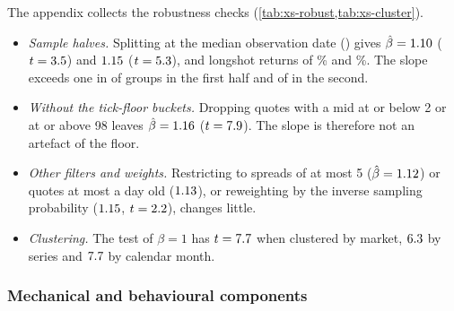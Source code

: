 The appendix collects the robustness checks (\cref{tab:xs-robust,tab:xs-cluster}).
\begin{itemize}
\item \emph{Sample halves.} Splitting at the median observation date (\xsRobSplit) gives
      $\hat\beta=1.10$ ($t=3.5$) and $1.15$ ($t=5.3$),
      and longshot returns of \xsRobFirstLsMid\% and \xsRobSecondLsMid\%. The slope exceeds one in
      \xsRobFirstGroupsAboveOne{} of \xsRobFirstGroups{} groups in the first half and
      \xsRobSecondGroupsAboveOne{} of \xsRobSecondGroups{} in the second.
\item \emph{Without the tick-floor buckets.} Dropping quotes with a mid at or below 2\cents{} or at or
      above 98\cents{} leaves $\hat\beta=1.16$ ($t=7.9$). The slope is
      therefore not an artefact of the floor.
\item \emph{Other filters and weights.} Restricting to spreads of at most 5\cents{}
      ($\hat\beta=1.12$) or quotes at most a day old ($1.13$), or reweighting
      by the inverse sampling probability ($1.15$, $t=2.2$), changes little.
\item \emph{Clustering.} The test of $\beta=1$ has $t=7.7$ when clustered by market,
      $6.3$ by series and $7.7$ by calendar month.
\end{itemize}

\subsubsection{Mechanical and behavioural components}\label{sec:res-xs-summary}

